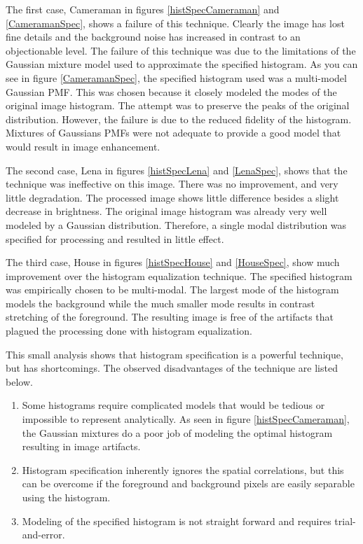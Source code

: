\documentclass[journal]{IEEEtran}
\begin{document}
\par The first case, Cameraman in figures \ref{histSpecCameraman} and \ref{CameramanSpec}, shows a failure of this technique. Clearly the image has lost fine details and the background noise has increased in contrast to an objectionable level. The failure of this technique was due to the limitations of the Gaussian mixture model used to approximate the specified histogram. As you can see in figure \ref{CameramanSpec}, the specified histogram used was a multi-model Gaussian PMF. This was chosen because it closely modeled the modes of the original image histogram. The attempt was to preserve the peaks of the original distribution. However, the failure is due to the reduced fidelity of the histogram. Mixtures of Gaussians PMFs were not adequate to provide a good model that would result in image enhancement.
\par The second case, Lena in figures \ref{histSpecLena} and \ref{LenaSpec}, shows that the technique was ineffective on this image. There was no improvement, and very little degradation. The processed image shows little difference besides a slight decrease in brightness. The original image histogram was already very well modeled by a Gaussian distribution. Therefore, a single modal distribution was specified for processing and resulted in little effect.
\par The third case, House in figures \ref{histSpecHouse} and \ref{HouseSpec}, show much improvement over the histogram equalization technique. The specified histogram was empirically chosen to be multi-modal. The largest mode of the histogram models the background while the much smaller mode results in contrast stretching of the foreground. The resulting image is free of the artifacts that plagued the processing done with histogram equalization.
\par This small analysis shows that histogram specification is a powerful technique, but has shortcomings. The observed disadvantages of the technique are listed below.

\begin{enumerate}
\item Some histograms require complicated models that would be tedious or impossible to represent analytically. As seen in figure \ref{histSpecCameraman}, the Gaussian mixtures do a poor job of modeling the optimal histogram resulting in image artifacts.
\item Histogram specification inherently ignores the spatial correlations, but this can be overcome if the foreground and background pixels are easily separable using the histogram.
\item Modeling of the specified histogram is not straight forward and requires trial-and-error.
\end{enumerate}
\end{document}

